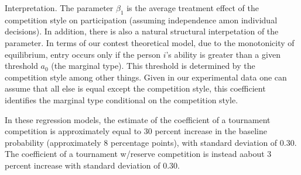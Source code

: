 \documentclass[]{article}
\begin{document}
Interpretation. The parameter \(\beta_1\) is the average treatment
effect of the competition style on participation (assuming independence
amon individual decisions). In addition, there is also a natural
structural interpetation of the parameter. In terms of our contest
theoretical model, due to the monotonicity of equilibrium, entry occurs
only if the person \(i\)'s ability is greater than a given threshold
\(a_0\) (the marginal type). This threshold is determined by the
competition style among other things. Given in our experimental data one
can assume that all else is equal except the competition style, this
coefficient identifies the marginal type conditional on the competition
style.

In these regression models, the estimate of the coefficient of a
tournament competition is approximately equal to 30 percent increase in
the baseline probability (approximately 8 percentage points), with
standard deviation of \(0.30\). The coefficient of a tournament
w/reserve competition is instead aabout 3 percent increase with standard
deviation of \(0.30\).
\end{document}
